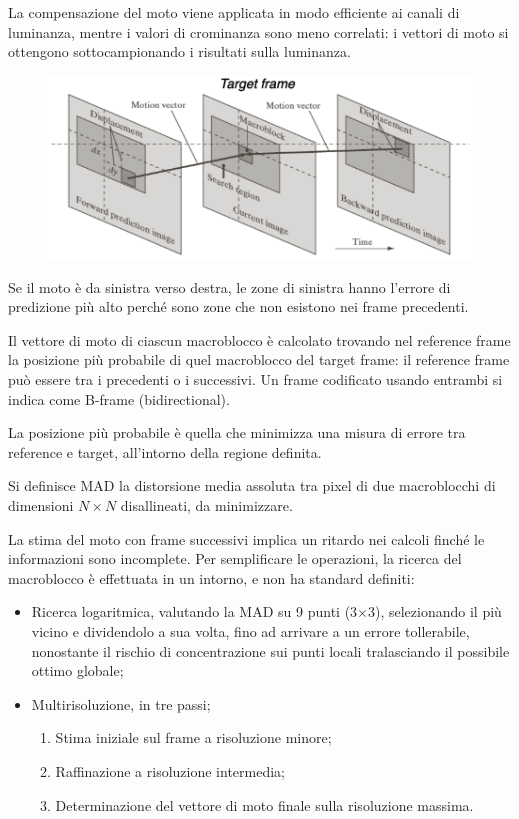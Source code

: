 La compensazione del moto viene applicata in modo efficiente ai canali di luminanza, mentre i valori di crominanza sono meno correlati: i vettori di moto si ottengono sottocampionando i risultati sulla luminanza.

\begin{figure}[h]
	\centering
	\includegraphics[scale=0.4]{Lezioni/Immagini/motion-estimation}
\end{figure}

Se il moto è da sinistra verso destra, le zone di sinistra hanno l'errore di predizione più alto perché sono zone che non esistono nei frame precedenti.

Il vettore di moto di ciascun macroblocco è calcolato trovando nel reference frame la posizione più probabile di quel macroblocco del target frame: il reference frame può essere tra i precedenti o i successivi. Un frame codificato usando entrambi si indica come B-frame (bidirectional).

La posizione più probabile è quella che minimizza una misura di errore tra reference e target, all'intorno della regione definita.

Si definisce MAD la distorsione media assoluta tra pixel di due macroblocchi di dimensioni $N \times N$ disallineati, da minimizzare.

La stima del moto con frame successivi implica un ritardo nei calcoli finché le informazioni sono incomplete. Per semplificare le operazioni, la ricerca del macroblocco è effettuata in un intorno, e non ha standard definiti:
\begin{itemize}
	\item Ricerca logaritmica, valutando la MAD su 9 punti (3$\times$3), selezionando il più vicino e dividendolo a sua volta, fino ad arrivare a un errore tollerabile, nonostante il rischio di concentrazione sui punti locali tralasciando il possibile ottimo globale;
	\item Multirisoluzione, in tre passi;
	\begin{enumerate}
		\item Stima iniziale sul frame a risoluzione minore;
		\item Raffinazione a risoluzione intermedia;
		\item Determinazione del vettore di moto finale sulla risoluzione massima.
	\end{enumerate}
\end{itemize}

